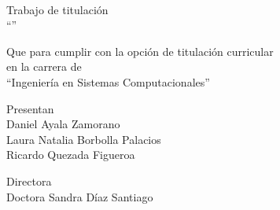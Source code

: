 \documentclass{article}
\begin{document}
  \begin{center}
    \instituto \\
    \escuela \par
    \acronimoDeEscuela \par
    Trabajo de titulación \\
    ``\titulo'' \par
    Que para cumplir con la opción de titulación curricular \\
    en la carrera de \\
    ``Ingeniería en Sistemas Computacionales''\par
    Presentan\\
    Daniel Ayala Zamorano \\
    Laura Natalia Borbolla Palacios \\
    Ricardo Quezada Figueroa \par
    Directora \\
    Doctora Sandra Díaz Santiago \par
  \end{center}
  \newpage
  \SetWatermarkText{}
  
\end{document}
